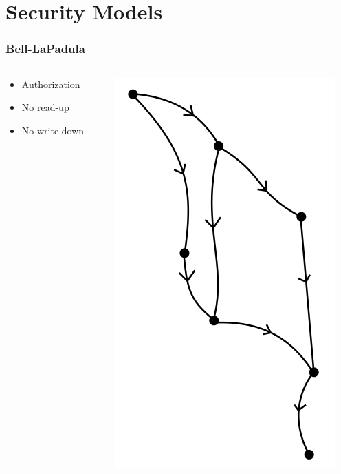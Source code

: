 
\section{Security Models}

\begin{frame}
  \frametitle{Bell-LaPadula}
  \begin{columns}
    \begin{column}{.5\textwidth}
      \begin{itemize}
        \item Authorization
        \item No read-up
        \item No write-down
      \end{itemize}
      \vspace{5em}
    \end{column}
    \begin{column}{.5\textwidth}
      \centering
      \includegraphics[height=.7\textheight]{graphics/blp_lattice}
    \end{column}
  \end{columns}
\end{frame}

